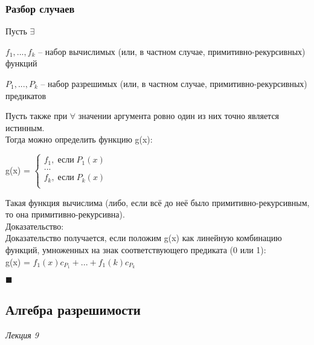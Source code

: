 \documentclass{article}
\begin{document}
\subsubsection{Разбор случаев}
    Пусть $\exists$
        
        $f_{1}, ... , f_{k}$ -- набор вычислимых (или, в частном случае, примитивно-рекурсивных) функций
        
        $P_{1}, ... , P_{k}$ -- набор разрешимых (или, в частном случае, примитивно-рекурсивных) предикатов
        
    Пусть также при $\forall$ значении аргумента ровно один из них точно является истинным.\\
    
    Тогда можно определить функцию g(x):
    
    g(x) = 
        $\left\{ 
            \begin{aligned} 
            f_{1},\; \text{если} \;P_{1}(x)\\
            ...\\
            f_{k},\; \text{если} \;P_{k}(x)\\
        \end{aligned}
        \right. $
    
    Такая функция вычислима (либо, если всё до неё было примитивно-рекурсивным, то она примитивно-рекурсивна).\\
    
    
    Доказательство:\\
    Доказательство получается, если положим g(x) как линейную комбинацию функций, умноженных на знак соответствующего предиката (0 или 1):\\
    g(x) = $f_{1}(x)c_{P_{1}} + ... + f_{1}(k)c_{P_{k}}$
    \begin{flushright}
        $\blacksquare$
    \end{flushright}


\subsection{Алгебра разрешимости}
\emph{Лекция 9}\\
\end{document}
